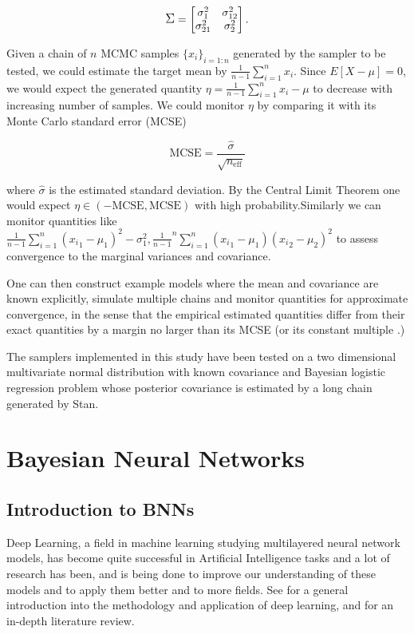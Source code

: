 \documentclass[12pt]{report}
\begin{document}
\begin{displaymath}
\mathlarger{\Sigma} = 
\begin{bmatrix}
\sigma^2_1 &\sigma_{12}^2 \\
\sigma_{21}^2 &\sigma^2_2 \\
\end{bmatrix}.
\end{displaymath}

Given a chain of $n$ MCMC samples $\{x_i\}_{i=1:n}$ generated by the sampler to be tested, we could estimate  the target mean by $ \frac{1}{n-1} \sum_{i=1}^ n x_i$. Since $E[X-\mu] = 0$, we would expect the generated quantity $\eta= \frac{1}{n-1} \sum_{i=1}^ n x_i -\mu$ to decrease with increasing number of samples. We could monitor $\eta$ by comparing it with its Monte Carlo standard error (MCSE) 

\[ \text{MCSE} = \frac{\hat{\sigma}}{\sqrt{n_{\text{eff}}}} \]

where $\hat{\sigma}$ is the estimated standard deviation. By the Central Limit Theorem one would expect  $\eta \in (-\text{MCSE},\text{MCSE})$ with high probability.Similarly we can monitor quantities like $\frac{1}{n-1} \sum_{i=1}^n ({x_i}_1 -\mu_1)^2 - \sigma^2_1,  \frac{1}{n-1}^n \sum_{i=1}^n ({x_i}_1 - \mu_1)({x_i}_2 - \mu_2)^2 $ to assess convergence to the marginal variances and covariance.

One can then construct example models where the mean and covariance are known explicitly, simulate multiple chains and monitor quantities for approximate convergence, in the sense that the empirical estimated quantities differ from their exact quantities by a margin no larger than its MCSE (or its constant multiple .) 

The samplers implemented in this study have been tested on a two dimensional multivariate normal distribution with known covariance and Bayesian logistic regression problem whose posterior covariance is estimated by a long chain generated by Stan.

\chapter{Bayesian Neural Networks}
\section{Introduction to BNNs}

Deep Learning, a field in machine learning studying multilayered neural network models, has become quite successful in Artificial Intelligence tasks and a lot of research has been, and is being done to improve our understanding of these models and to apply them better and to more fields. See \cite{Goodfellow-et-al-2016-Book,lecun2015deep} for a general introduction into the methodology and application of deep learning, and \cite{schmidhuber2015deep} for an in-depth literature review. 
\end{document}
